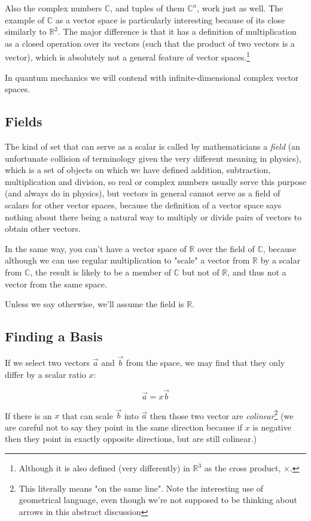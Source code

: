Also the complex numbers $\mathbb{C}$, and tuples of them $\mathbb{C}^n$, work just as well. The example of $\mathbb{C}$ as a vector space is particularly interesting because of its close similarly to $\mathbb{R}^2$. The major difference is that it has a definition of multiplication as a closed operation over its vectors (such that the product of two vectors is a vector), which is absolutely not a general feature of vector spaces.\footnote{Although it is also defined (very differently) in $\mathbb{R}^3$ as the cross product, $\times$.}

In quantum mechanics we will contend with infinite-dimensional complex vector spaces.

\subsection{Fields}

The kind of set that can serve as a scalar is called by mathematicians a \textit{field} (an unfortunate collision of terminology given the very different meaning in physics), which is a set of objects on which we have defined addition, subtraction, multiplication and division, so real or complex numbers usually serve this purpose (and always do in physics), but vectors in general cannot serve as a field of scalars for other vector spaces, because the definition of a vector space says nothing about there being a natural way to multiply or divide pairs of vectors to obtain other vectors.

In the same way, you can't have a vector space of $\mathbb{R}$ over the field of $\mathbb{C}$, because although we can use regular multiplication to "scale" a vector from $\mathbb{R}$ by a scalar from $\mathbb{C}$, the result is likely to be a member of $\mathbb{C}$ but not of $\mathbb{R}$, and thus not a vector from the same space.

Unless we say otherwise, we'll assume the field is $\mathbb{R}$.

\subsection{Finding a Basis}

If we select two vectors $\vec{a}$ and $\vec{b}$ from the space, we may find that they only differ by a scalar ratio $x$:

$$
\vec{a} = x \vec{b}
$$

If there is an $x$ that can scale $\vec{b}$ into $\vec{a}$ then those two vector are \textit{colinear}\footnote{This literally means "on the same line". Note the interesting use of geometrical language, even though we're not supposed to be thinking about arrows in this abstract discussion} (we are careful not to say they point in the same direction because if $x$ is negative then they point in exactly opposite directions, but are still colinear.)

